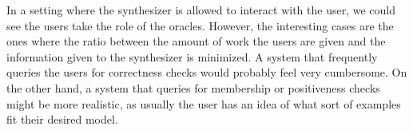 In a setting where the synthesizer is allowed to interact with the user, we
could see the users take the role of the oracles.
However, the interesting cases are the ones where the ratio between the amount
of work the users are given and the information given to the synthesizer is
minimized.
A system that frequently queries the users for correctness checks would probably
feel very cumbersome.
On the other hand, a system that queries for membership or positiveness checks
might be more realistic, as usually the user has an idea of what sort of
examples fit their desired model.

